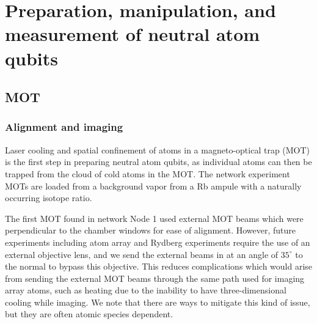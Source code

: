 \chapter{Preparation, manipulation, and measurement of neutral atom qubits}\label{ch:qubit_prep}

\section{MOT}
\subsection{Alignment and imaging}

Laser cooling and spatial confinement of atoms in a magneto-optical trap (MOT) is the first step in preparing neutral atom qubits, as individual atoms can then be trapped from the cloud of cold atoms in the MOT. The network experiment MOTs are loaded from a background vapor from a Rb ampule with a naturally occurring isotope ratio.

The first MOT found in network Node 1 used external MOT beams which were perpendicular to the chamber windows for ease of alignment. However, future experiments including atom array and Rydberg experiments require the use of an external objective lens, and we
send the external beams in at an angle of $35^{\circ}$ to the normal to bypass this objective. This reduces complications which would arise from sending the external MOT beams through the same path used for imaging array atoms, such as heating due to the inability to have three-dimensional cooling while imaging. We note that there are ways to mitigate this kind of issue, but they are often atomic species dependent\cite{covey20192000}.

